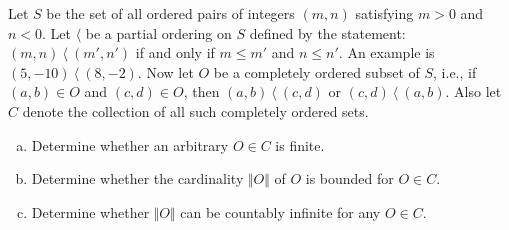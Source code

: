 Let $S$ be the set of all ordered pairs of integers $(m, n)$ satisfying $m > 0$
and $n < 0$. Let $\langle$ be a partial ordering on $S$ defined by the statement:
$(m, n) \ \langle\ (m', n')$ if and only if $m \le m'$ and $n \le n'$. An example
is $(5, - 10) \ \langle\ (8, - 2)$. Now let $O$ be a completely ordered subset of
$S$, i.e., if $(a, b) \in O$ and $(c, d ) \in O$, then $(a, b) \ \langle\ (c, d )$
or $(c, d ) \ \langle\  (a, b)$. Also let $C$ denote the collection of all such
completely ordered sets.

\begin{enumerate}[(a)]

\item Determine whether an arbitrary $O \in C$ is finite.
\item Determine whether the cardinality $\Vert O \Vert$ of $O$ is bounded for $O \in C$.
\item Determine whether $\Vert O \Vert$ can be countably infinite for any $O \in C$.

\end{enumerate}

